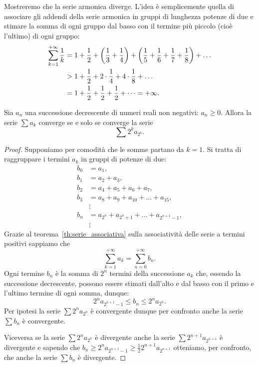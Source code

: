 Mostreremo che la serie armonica diverge.
L'idea è semplicemente quella di associare gli addendi della serie armonica
in gruppi di lunghezza potenze di due e stimare la somma di ogni gruppo dal basso
con il termine più piccolo (cioè l'ultimo) di ogni gruppo:
\begin{align*}
 \sum_{k=1}^{+\infty} \frac{1}{k}
 & = 1 + \frac 1 2
     + {\left( \frac 1 3 + \frac 1 4 \right)}
     + {\left( \frac 1 5 + \frac 1 6 + \frac 1 7 + \frac 1 8 \right)}
     + \dots\\
 & > 1 + \frac 1 2 + 2 \cdot \frac 1 4 + 4 \cdot \frac 1 8 + \dots \\
   & = 1 + \frac 1 2 + \frac 1 2 + \frac 1 2 + \dots
    = +\infty.
\end{align*}

\begin{theorem}%
\label{th:condensazione}%
\mymark{**}%
%
%
%
%
Sia $a_n$ una successione decrescente di numeri reali non negativi:
$a_n \ge 0$.
Allora la serie $\sum a_k$ converge se e solo se converge
la serie
\[
  \sum 2^k a_{2^k}.
\]
\end{theorem}
%
\begin{proof}
\mymark{**}
Supponiamo per comodità che le somme partano da $k=1$.
Si tratta di raggruppare i termini $a_k$ in gruppi di potenze di due:
\begin{align*}
  b_0 & = a_1, \\
  b_1 &= a_2 +  a_3, \\
  b_2 &= a_4 +  a_5 +  a_6 +  a_7, \\
  b_3 &= a_8 +  a_9 +  a_{10} + \dots + a_{15}, \\
  &\vdots\\
  b_n &= a_{2^n} +  a_{2^{n}+1} + \dots + a_{2^{n+1}-1},\\
  &\vdots
\end{align*}
Grazie al teorema~\ref{th:serie_associativa} sulla associatività
delle serie a termini positivi sappiamo che
  \[
  \sum_{k=1}^{+\infty} a_k = \sum_{n=0}^{+\infty} b_n.
  \]
Ogni termine $b_n$ è la somma di $2^n$ termini della
successione $a_k$ che, essendo la successione decrescente,
possono essere stimati dall'alto e dal basso con il primo
e l'ultimo termine di ogni somma, dunque:
\[
  2^n a_{2^{n+1}-1} \le b_n \le 2^n a_{2^{n}}.
\]
Per ipotesi la serie $\sum 2^n a_{2^n}$ è convergente
dunque per confronto anche la serie $\sum b_n$ è convergente.

Viceversa se la serie $\sum 2^n a_{2^n}$ è divergente
anche la serie $\sum 2^{n+1} a_{2^{n+1}}$ è divergente
e sapendo che $b_n\ge 2^n a_{2^{n+1}-1}\ge \frac 1 2 2^{n+1} a_{2^{n+1}}$
otteniamo, per confronto, che anche la serie $\sum b_n$ è divergente.
\end{proof}

